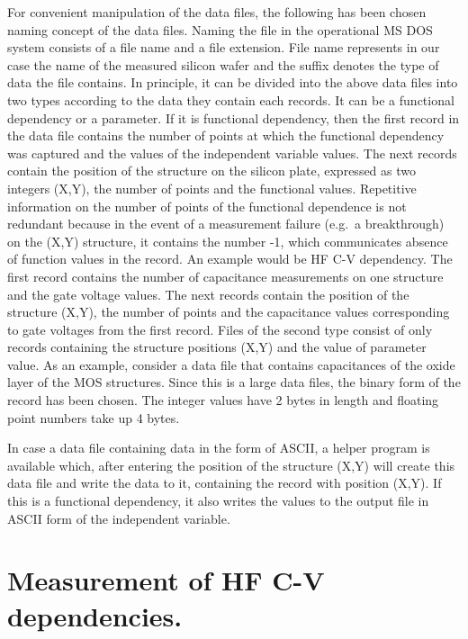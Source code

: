 For convenient manipulation of the data files, the following has been
chosen naming concept of the data files. Naming the file in the
operational MS DOS system consists of a file name and a file
extension.  File name represents in our case the name of the measured
silicon wafer and the suffix denotes the type of data the file
contains. In principle, it can be divided into the above data files
into two types according to the data they contain each records. It can
be a functional dependency or a parameter. If it is functional
dependency, then the first record in the data file contains the number
of points at which the functional dependency was captured and the
values of the independent variable values. The next records contain
the position of the structure on the silicon plate, expressed as two
integers (X,Y), the number of points and the functional values.
Repetitive information on the number of points of the functional
dependence is not redundant because in the event of a measurement
failure (e.g.\ a breakthrough) on the (X,Y) structure, it contains the
number -1, which communicates absence of function values in the
record. An example would be HF C-V dependency. The first record
contains the number of capacitance measurements on one structure and
the gate voltage values. The next records contain the position of the
structure (X,Y), the number of points and the capacitance values
corresponding to gate voltages from the first record. Files of the
second type consist of only records containing the structure positions
(X,Y) and the value of parameter value. As an example, consider a data
file that contains capacitances of the oxide layer of the MOS\@
structures. Since this is a large data files, the binary form of the
record has been chosen.  The integer values have 2 bytes in length and
floating point numbers take up 4 bytes.

In case a data file containing data in the form of ASCII, a helper
program is available which, after entering the position of the
structure (X,Y) will create this data file and write the data to it,
containing the record with position (X,Y). If this is a functional
dependency, it also writes the values to the output file in ASCII form
of the independent variable.

\section{Measurement of HF C-V dependencies.}\label{sec:5.1}

